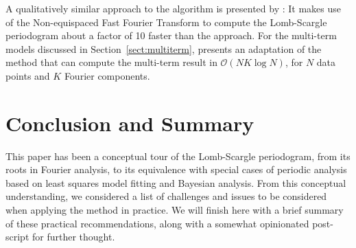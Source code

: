 \documentclass[preprint]{aastex}
\newcommand{\Sect}[1]{Section~\ref{sect:#1}}
\newcommand{\sect}[1]{\Sect{#1}}
\newcommand{\sectlabel}[1]{\label{sect:#1}}
\begin{document}
A qualitatively similar approach to the \citet{Press89} algorithm
is presented by \citet{Leroy2012}:
It makes use of the Non-equispaced Fast Fourier Transform
\citep[NFFT, see][]{Keiner2009} to compute the Lomb-Scargle periodogram about
a factor of 10 faster than the \citet{Press89} approach.
For the multi-term models discussed in \sect{multiterm}, \citet{Palmer09}
presents an adaptation of the \citet{Press89} method that can compute the
multi-term result in $\mathcal{O}(NK\log N)$, for $N$ data points and
$K$ Fourier components.


\section{Conclusion and Summary}
\sectlabel{conclusion}

This paper has been a conceptual tour of the Lomb-Scargle periodogram, from
its roots in Fourier analysis, to its equivalence with special cases of
periodic analysis based on least squares model fitting and Bayesian
analysis.
From this conceptual understanding, we considered a list of challenges
and issues to be considered when applying the method in practice.
We will finish here with a brief summary of these practical
recommendations, along with a somewhat opinionated
post-script for further thought.
\end{document}
